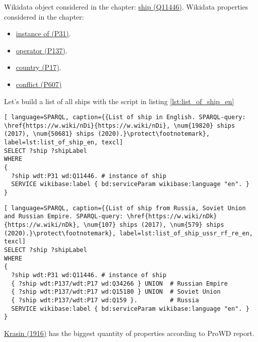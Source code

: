 Wikidata object considered in the chapter: \href{https://www.wikidata.org/wiki/Q11446}{ship (Q11446)}.
Wikidata properties considered in the chapter: 
\begin{itemize}
  \item \href{https://www.wikidata.org/wiki/Property:P31}{instance of (P31)}.
  \item \href{https://www.wikidata.org/wiki/Property:P137}{operator (P137)}.
  \item \href{https://www.wikidata.org/wiki/Property:P17}{country (P17)}.
  \item \href{https://www.wikidata.org/wiki/Property:P607}{conflict (P607)}
\end{itemize}

Let's build a list of all ships with the script in listing \ref{lst:list_of_ship_en}

\begin{lstlisting}[ language=SPARQL, caption={{List of ship in English. SPARQL-query: \href{https://w.wiki/nDi}{https://w.wiki/nDi}, \num{19820} ships (2017), \num{50681} ships (2020).}\protect\footnotemark}, label=lst:list_of_ship_en, texcl]
SELECT ?ship ?shipLabel
WHERE
{
  ?ship wdt:P31 wd:Q11446. # instance of ship
  SERVICE wikibase:label { bd:serviceParam wikibase:language "en". }
}
\end{lstlisting}

  
\begin{lstlisting}[ language=SPARQL, caption={{List of ship from Russia, Soviet Union and Russian Empire. SPARQL-query: \href{https://w.wiki/nDk}{https://w.wiki/nDk}, \num{107} ships (2017), \num{579} ships (2020).}\protect\footnotemark}, label=lst:list_of_ship_ussr_rf_re_en, texcl]
SELECT ?ship ?shipLabel
WHERE
{
  ?ship wdt:P31 wd:Q11446. # instance of ship
  { ?ship wdt:P137/wdt:P17 wd:Q34266 } UNION  # Russian Empire
  { ?ship wdt:P137/wdt:P17 wd:Q15180 } UNION  # Soviet Union
  { ?ship wdt:P137/wdt:P17 wd:Q159 }.         # Russia
  SERVICE wikibase:label { bd:serviceParam wikibase:language "en". }
}
\end{lstlisting}

\href{https://www.wikidata.org/wiki/Q281147}{Krasin (1916)} has the biggest quantity of properties according to ProWD report.
  


